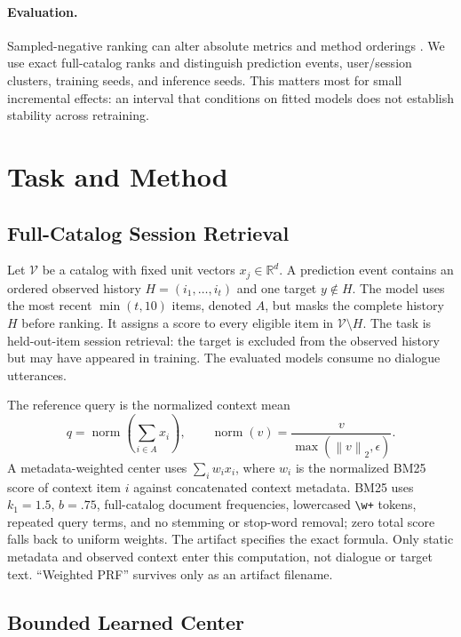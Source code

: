 \documentclass[runningheads]{llncs}
\newcommand{\norm}[1]{\left\lVert #1 \right\rVert_2}
\begin{document}
\paragraph{Evaluation.}
Sampled-negative ranking can alter absolute metrics and method orderings
\cite{krichene2020sampled}. We use exact full-catalog ranks and distinguish
prediction events, user/session clusters, training seeds, and inference seeds.
This matters most for small incremental effects: an interval that conditions on
fitted models does not establish stability across retraining.

\section{Task and Method}
\label{sec:method}

\subsection{Full-Catalog Session Retrieval}

Let $\mathcal{V}$ be a catalog with fixed unit vectors
$x_j\in\mathbb{R}^{d}$. A prediction event contains an ordered observed history
$H=(i_1,\ldots,i_t)$ and one target $y\notin H$. The model uses the most recent
$\min(t,10)$ items, denoted $A$, but masks the complete history $H$ before
ranking. It assigns a score to every eligible item in
$\mathcal{V}\setminus H$. The task is held-out-item session retrieval: the
target is excluded from the observed history but may have appeared in
training. The evaluated models consume no dialogue utterances.

The reference query is the normalized context mean
\begin{equation}
 q=\operatorname{norm}\!\left(\sum_{i\in A}x_i\right),\qquad
 \operatorname{norm}(v)=\frac{v}{\max(\norm{v},\epsilon)}.
 \label{eq:mean}
\end{equation}
A metadata-weighted center uses $\sum_i w_i x_i$, where $w_i$ is the normalized
BM25 score of context item $i$ against concatenated context metadata. BM25 uses
$k_1=1.5$, $b=.75$, full-catalog document frequencies, lowercased \verb|\w+|
tokens, repeated query terms, and no stemming or stop-word removal; zero total
score falls back to uniform weights. The artifact specifies the exact formula.
Only static metadata and observed context enter this computation, not dialogue
or target text. ``Weighted PRF'' survives only as an artifact filename.

\subsection{Bounded Learned Center}
\end{document}
